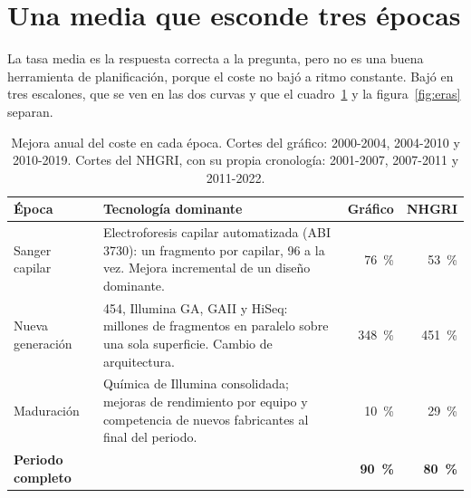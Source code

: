 \documentclass[11pt,letterpaper]{article}
\begin{document}
\section{Una media que esconde tres épocas}
\label{sec:eras}

La tasa media es la respuesta correcta a la pregunta, pero no es una buena
herramienta de planificación, porque el coste no bajó a ritmo constante. Bajó
en tres escalones, que se ven en las dos curvas y que el
cuadro~\ref{tab:eras} y la figura~\ref{fig:eras} separan.

\begin{table}[htbp]
\centering
\small
\renewcommand{\arraystretch}{1.2}
\begin{tabularx}{\textwidth}{@{}p{3.2cm}Xrr@{}}
\toprule
\textbf{Época} & \textbf{Tecnología dominante} & \textbf{Gráfico} &
  \textbf{NHGRI} \\
\midrule
Sanger capilar & Electroforesis capilar automatizada (ABI 3730): un fragmento
  por capilar, 96 a la vez. Mejora incremental de un diseño dominante. &
  76~\% & 53~\% \\
Nueva generación & 454, Illumina GA, GAII y HiSeq: millones de fragmentos en
  paralelo sobre una sola superficie. Cambio de arquitectura. &
  348~\% & 451~\% \\
Maduración & Química de Illumina consolidada; mejoras de rendimiento por
  equipo y competencia de nuevos fabricantes al final del periodo. &
  10~\% & 29~\% \\
\midrule
\textbf{Periodo completo} & & \textbf{90~\%} & \textbf{80~\%} \\
\bottomrule
\end{tabularx}
\caption{Mejora anual del coste en cada época. Cortes del gráfico: 2000-2004,
2004-2010 y 2010-2019. Cortes del NHGRI, con su propia cronología:
2001-2007, 2007-2011 y 2011-2022.}
\label{tab:eras}
\end{table}
\end{document}
